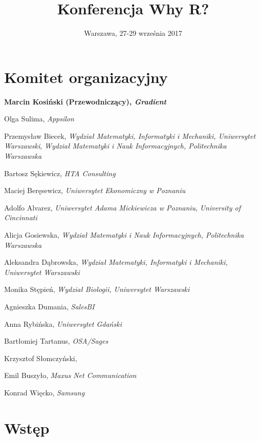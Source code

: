 \documentclass[11pt,twoside,b5paper]{book}
\title{Konferencja Why R?}
\author{Warszawa, 27-29 września 2017}
\date{}
\begin{document}


\clearpage

\frontmatter
\maketitle

\begin{small}
\tableofcontents
\end{small}

\mainmatter

\chapter{Komitet organizacyjny}

\textbf{Marcin Kosiński (Przewodniczący), \textit{Gradient}}

Olga Sulima, \textit{Appsilon}

Przemysław Biecek, \textit{Wydział Matematyki, Informatyki i Mechaniki, Uniwersytet Warszawski}, \textit{Wydział Matematyki i Nauk Informacyjnych, Politechnika Warszawska} 

Bartosz Sękiewicz, \textit{HTA Consulting}

Maciej Beręsewicz, \textit{Uniwersytet Ekonomiczny w Poznaniu}

Adolfo Alvarez, \textit{Uniwersytet Adama Mickiewicza w Poznaniu}, \textit{University of Cincinnati}

Alicja Gosiewska, \textit{Wydział Matematyki i Nauk Informacyjnych, Politechnika Warszawska}

Aleksandra Dąbrowska, \textit{Wydział Matematyki, Informatyki i Mechaniki, Uniwersytet Warszawski}

Monika Stępień, \textit{Wydział Biologii, Uniwersytet Warszawski}

Agnieszka Dumania, \textit{SalesBI}

Anna Rybińska, \textit{Uniwersytet Gdański}

Bartłomiej Tartanus, \textit{OSA/Sages}

Krzysztof Słomczyński, \textit{}

Emil Buszyło, \textit{Maxus Net Communication}

Konrad Więcko, \textit{Samsung}

\chapter{Wstęp}

\end{document}
